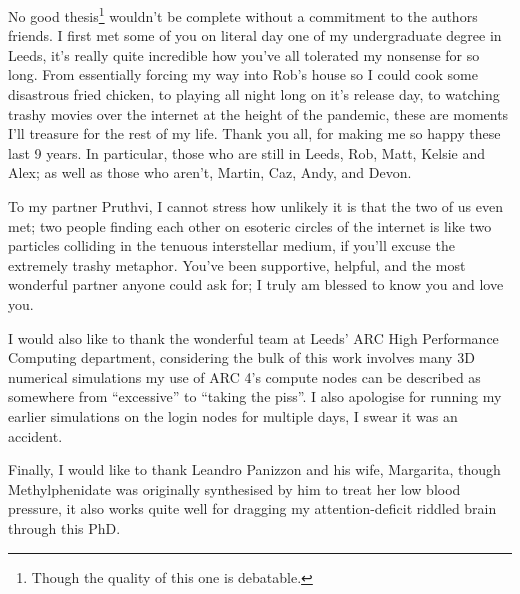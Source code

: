 

\begin{acknowledgements}      %

\setlength{\parindent}{17.62482pt}
\setlength{\parskip}{0.0pt plus 1.0pt}

No good thesis\footnote{Though the quality of this one is debatable.} wouldn't be complete without a commitment to the authors friends.
I first met some of you on literal day one of my undergraduate degree in Leeds, it's really quite incredible how you've all tolerated my nonsense for so long.
From essentially forcing my way into Rob's house so I could cook some disastrous fried chicken, to playing  all night long on it's release day, to watching trashy movies over the internet at the height of the pandemic, these are moments I'll treasure for the rest of my life.
Thank you all, for making me so happy these last 9 years.
In particular, those who are still in Leeds, Rob, Matt, Kelsie and Alex; as well as those who aren't, Martin, Caz, Andy, and Devon. 

To my partner Pruthvi, I cannot stress how unlikely it is that the two of us even met; two people finding each other on esoteric circles of the internet is like two particles colliding in the tenuous interstellar medium, if you'll excuse the extremely trashy metaphor.
You've been supportive, helpful, and the most wonderful partner anyone could ask for; I truly am blessed to know you and love you.

I would also like to thank the wonderful team at Leeds' ARC High Performance Computing department, considering the bulk of this work involves many 3D numerical simulations my use of ARC 4's compute nodes can be described as somewhere from ``excessive'' to ``taking the piss''.
I also apologise for running my earlier simulations on the login nodes for multiple days, I swear it was an accident.

Finally, I would like to thank Leandro Panizzon and his wife, Margarita, though Methylphenidate was originally synthesised by him to treat her low blood pressure, it also works quite well for dragging my attention-deficit riddled brain through this PhD.

\end{acknowledgements}


